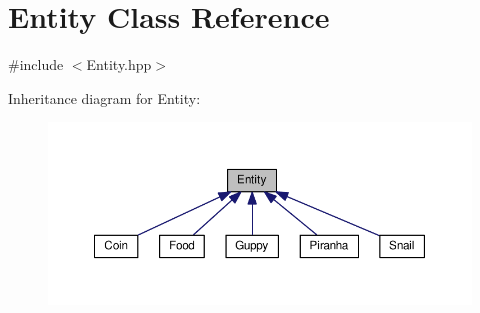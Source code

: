 \hypertarget{classEntity}{}\section{Entity Class Reference}
\label{classEntity}


{\ttfamily \#include $<$Entity.\+hpp$>$}



Inheritance diagram for Entity\+:
\nopagebreak
\begin{figure}[H]
\begin{center}
\leavevmode
\includegraphics[width=350pt]{classEntity__inherit__graph}
\end{center}
\end{figure}
